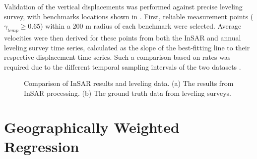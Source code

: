 Validation of the vertical displacements was performed against precise leveling survey, with benchmarks locations shown in . First, reliable measurement points ($\gamma_\textit{temp} \ge 0.65$) within a 200 m radius of each benchmark were selected. Average velocities were then derived for these points from both the InSAR and annual leveling survey time series, calculated as the slope of the best-fitting line to their respective displacement time series. Such a comparison based on rates was required due to the different temporal sampling intervals of the two datasets .

\begin{figure}[H]
	\centering
	
	\begin{subfigure}[b]{0.3\textwidth}
		\centering
		\framebox{\rule{0pt}{8cm}\rule{\textwidth}{0pt}}
		\caption{} %
		\label{fig:insar_leveling_a} %
	\end{subfigure}
	\quad
	\begin{subfigure}[b]{0.3\textwidth}
		\centering
		\framebox{\rule{0pt}{8cm}\rule{\textwidth}{0pt}}
		\caption{} %
		\label{fig:insar_leveling_b} %
	\end{subfigure}
	
	\caption{Comparison of InSAR results and leveling data. (a) The results from InSAR processing. (b) The ground truth data from leveling surveys.}
	\label{fig:insar_leveling} %
\end{figure}



\section{Geographically Weighted Regression}
\label{sec:gwr}

